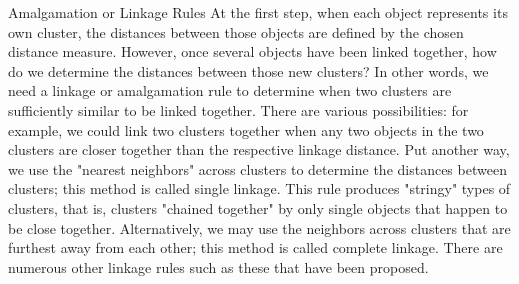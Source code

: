Amalgamation or Linkage Rules
At the first step, when each object represents its own cluster, the distances between those objects are defined by the chosen distance measure. However, once several objects have been linked together, how do we determine the distances between those new clusters? In other words, we need a linkage or amalgamation rule to determine when two clusters are sufficiently similar to be linked together. There are various possibilities: for example, we could link two clusters together when any two objects in the two clusters are closer together than the respective linkage distance. Put another way, we use the "nearest neighbors" across clusters to determine the distances between clusters; this method is called single linkage. This rule produces "stringy" types of clusters, that is, clusters "chained together" by only single objects that happen to be close together. Alternatively, we may use the neighbors across clusters that are furthest away from each other; this method is called complete linkage. There are numerous other linkage rules such as these that have been proposed.

